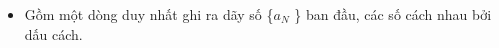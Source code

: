 \begin{itemize}
	\item     Gồm một dòng duy nhất ghi ra dãy số \{$a_{N}$    \} ban đầu, các số cách nhau bởi dấu cách.   
\end{itemize}